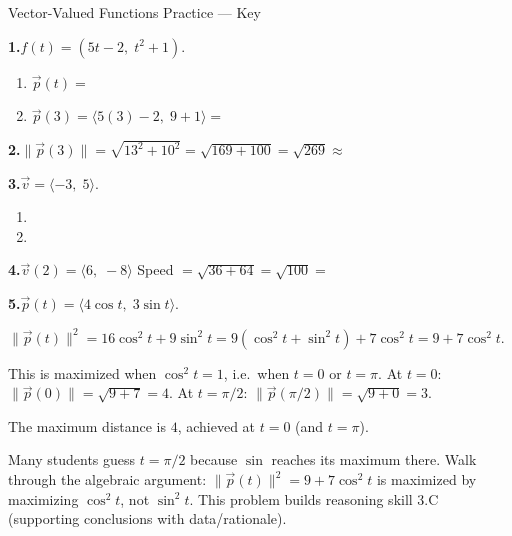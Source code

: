 \documentclass[10pt]{article}
\begin{document}
\namedateperiod

\vspace{0.12in}

\begin{notesbox}{Vector-Valued Functions Practice --- Key}
\small

\textbf{1.}\quad $f(t)=(5t-2,\;t^{2}+1)$.

\begin{enumerate}[label=(\alph*)]
  \item $\vec{p}(t) = $ 
  \item $\vec{p}(3) = \langle 5(3)-2,\;9+1\rangle = $ 
\end{enumerate}

\vspace{0.12in}

\textbf{2.}\quad $\|\vec{p}(3)\| = \sqrt{13^{2}+10^{2}} = \sqrt{169+100}
= \sqrt{269} \approx $ 

\vspace{0.12in}

\textbf{3.}\quad $\vec{v}=\langle -3,\;5\rangle$.

\begin{enumerate}[label=(\alph*)]
  \item {}
  \item {}
\end{enumerate}

\vspace{0.12in}

\textbf{4.}\quad $\vec{v}(2) = \langle 6,\;-8\rangle$ \qquad
Speed $= \sqrt{36+64} = \sqrt{100} = $ 

\vspace{0.12in}

\textbf{5.}\quad $\vec{p}(t)=\langle 4\cos t,\;3\sin t\rangle$.

$\|\vec{p}(t)\|^{2} = 16\cos^{2}t + 9\sin^{2}t
= 9(\cos^{2}t+\sin^{2}t) + 7\cos^{2}t
= 9 + 7\cos^{2}t.$

This is maximized when $\cos^{2}t=1$, i.e.\ when $t=0$ or $t=\pi$.
At $t=0$: $\|\vec{p}(0)\|=\sqrt{9+7}=4$. \quad
At $t=\pi/2$: $\|\vec{p}(\pi/2)\|=\sqrt{9+0}=3$.

The maximum distance is $4$, achieved at $t=0$ (and $t=\pi$).


\begin{teachernote}
  Many students guess $t=\pi/2$ because $\sin$ reaches its maximum there.
  Walk through the algebraic argument: $\|\vec{p}(t)\|^{2}=9+7\cos^{2}t$
  is maximized by maximizing $\cos^{2}t$, not $\sin^{2}t$.  This problem
  builds reasoning skill 3.C (supporting conclusions with data/rationale).
\end{teachernote}

\end{notesbox}
\end{document}
